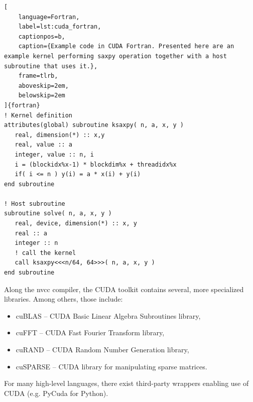\begin{lstlisting}[
    language=Fortran,
    label=lst:cuda_fortran,
    captionpos=b,
    caption={Example code in CUDA Fortran. Presented here are an example kernel performing saxpy operation together with a host subroutine that uses it.},
    frame=tlrb,
    aboveskip=2em,
    belowskip=2em
]{fortran}
! Kernel definition
attributes(global) subroutine ksaxpy( n, a, x, y )
   real, dimension(*) :: x,y
   real, value :: a
   integer, value :: n, i
   i = (blockidx%x-1) * blockdim%x + threadidx%x
   if( i <= n ) y(i) = a * x(i) + y(i)
end subroutine

! Host subroutine
subroutine solve( n, a, x, y )
   real, device, dimension(*) :: x, y
   real :: a
   integer :: n
   ! call the kernel
   call ksaxpy<<<n/64, 64>>>( n, a, x, y )
end subroutine
\end{lstlisting}

Along the nvcc compiler, the CUDA toolkit contains several, more specialized libraries. Among others, those include:
\begin{itemize}
    \item cuBLAS -- CUDA Basic Linear Algebra Subroutines library,
    \item cuFFT -- CUDA Fast Fourier Transform library,
    \item cuRAND -- CUDA Random Number Generation library,
    \item cuSPARSE -- CUDA library for manipulating sparse matrices.
\end{itemize}
For many high-level languages, there exist third-party wrappers enabling use of CUDA (e.g. PyCuda for Python).



